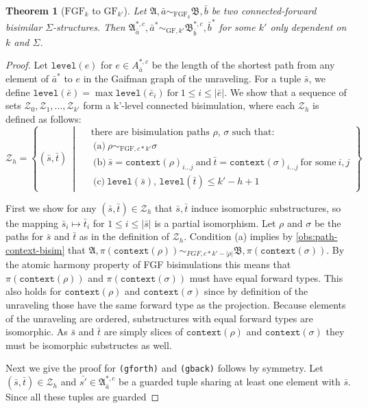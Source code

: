 \documentclass[draft]{scrartcl}
\newtheorem{theorem}{Theorem}
\theoremstyle{definition}
\newcommand{\context}[1]{\mathtt{context}(#1)}
\newcommand{\level}[1]{\mathtt{level}(#1)}
\begin{document}
\begin{theorem}[$\textrm{FGF}_{k}$ to $\textrm{GF}_{k'}$]
  Let $\mathfrak{A}, \bar{a} \sim_{\textrm{FGF}_{k}}\mathfrak{B}, \bar{b}$ be two connected-forward bisimilar $\Sigma$-structures.
  Then $\mathfrak{A}^{*,c}_{\bar{a}}, \bar{a}^{*} \sim_{\textrm{GF},k'} \mathfrak{B}^{*,c}_{\bar{b}}, \bar{b}^{*}$ for some $k'$ only dependent on $k$ and $\Sigma$.
\end{theorem}

\begin{proof}
  Let $\level{e}$ for $e \in A^{*,c}_{\bar{a}}$ be the length of the shortest path from any element of $\bar{a}^{*}$ to $e$ in the Gaifman graph of the unraveling.
  For a tuple $\bar{s}$, we define $\level{\bar{e}} = \max \level{\bar{e}_{i}}\ \text{for}\ 1 \le i \le |\bar{e}|$.
  We show that a sequence of sets $\mathcal{Z}_{0}, \mathcal{Z}_{1}, \ldots, \mathcal{Z}_{k'}$ form a k'-level connected bisimulation, where each $\mathcal{Z}_{h}$ is defined as follows:
  \begin{equation*}
    \mathcal{Z}_{h} = \left\{
      (\bar{s}, \bar{t})
      \ \middle|\
      \begin{aligned}
        & \text{there are bisimulation paths $\rho$, $\sigma$ such that:} \\
        & \ \text{(a)}\ \rho \sim_{\textrm{FGF}, c*k'} \sigma \\
        & \ \text{(b)}\ \bar{s} = \context{\rho}_{i\ldots{}j}\ \text{and}\ \bar{t} = \context{\sigma}_{i\ldots{}j}\ \text{for some}\ i, j \\
        & \ \text{(c)}\ \level{\bar{s}},\,\level{\bar{t}} \le k' - h + 1
      \end{aligned}
    \right\}
  \end{equation*}

  First we show for any $(\bar{s}, \bar{t}) \in \mathcal{Z}_{h}$ that $\bar{s}, \bar{t}$ induce isomorphic substructures, so the mapping $\bar{s}_{i} \mapsto \bar{t}_{i}$ for $1 \le i \le |\bar{s}|$ is a partial isomorphism.
  Let $\rho$ and $\sigma$ be the paths for $\bar{s}$ and $\bar{t}$ as in the definition of $\mathcal{Z}_{h}$.
  Condition (a) implies by \cref{obs:path-context-bisim} that $\mathfrak{A}, \pi(\context{\rho}) \sim_{FGF,c*k'-|\rho|} \mathfrak{B}, \pi(\context{\sigma})$.
  By the atomic harmony property of FGF bisimulations this means that $\pi(\context{\rho})$ and $\pi(\context{\sigma})$ must have equal forward types.
  This also holds for $\context{\rho}$ and $\context{\sigma}$ since by definition of the unraveling those have the same forward type as the projection.
  Because elements of the unraveling are ordered, substructures with equal forward types are isomorphic.
  As $\bar{s}$ and $\bar{t}$ are simply slices of $\context{\rho}$ and $\context{\sigma}$ they must be isomorphic substructes as well.

  Next we give the proof for \texttt{(gforth)} and \texttt{(gback)} follows by symmetry.
  Let $(\bar{s}, \bar{t}) \in \mathcal{Z}_{h}$ and $\bar{s'} \in \mathfrak{A}^{*,c}_{\bar{a}}$ be a guarded tuple sharing at least one element with $\bar{s}$.
  Since all these tuples are guarded
  \phantom{\qedhere}
\end{proof}
\end{document}
